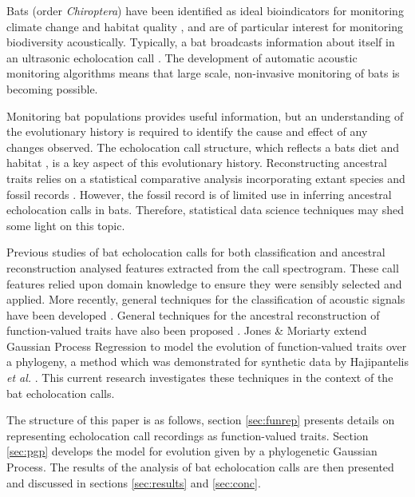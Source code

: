 \documentclass{ws-rv9x6}
\begin{document}
Bats (order \textit{Chiroptera}) have been identified as ideal bioindicators for monitoring climate change and habitat quality \cite{jones2009carpe}, and are of particular interest for monitoring biodiversity acoustically. Typically, a bat broadcasts information about itself in an ultrasonic echolocation call \cite{griffin1944echolocation}. The development of automatic acoustic monitoring algorithms \cite{stathopoulos2017bat} \cite{walters2012continental} means that large scale, non-invasive monitoring of bats is becoming possible.   

Monitoring bat populations provides useful information, but an understanding of the evolutionary history is required to identify the cause and effect of any changes observed. The echolocation call structure, which reflects a bats diet and habitat \cite{aldridge1987morphology}, is a key aspect of this evolutionary history. Reconstructing ancestral traits \cite{joy2016ancestral} relies on a statistical comparative analysis incorporating extant species and fossil records \cite{felsenstein2004inferring}. However, the fossil record is of limited use in inferring ancestral echolocation calls in bats. Therefore, statistical data science techniques may shed some light on this topic.

Previous studies of bat echolocation calls for both classification \cite{walters2012continental} and ancestral reconstruction \cite{collen2012evolution} analysed features extracted from the call spectrogram. These call features relied upon domain knowledge to ensure they were sensibly selected and applied. More recently, general techniques for the classification of acoustic signals have been developed \cite{stathopoulos2014bat} \cite{damoulas2010bayesian}. General techniques for the ancestral reconstruction of function-valued traits have also been proposed \cite{group2012phylogenetic}. Jones \& Moriarty \cite{jones2013evolutionary} extend Gaussian Process Regression \cite{rasmussen2006gaussian} to model the evolution of function-valued traits \cite{meyer2005up} over a phylogeny, a method which was demonstrated for synthetic data by Hajipantelis \textit{et al.} \cite{hadjipantelis2013function}. This current research investigates these techniques in the context of the bat echolocation calls.

The structure of this paper is as follows, section \ref{sec:funrep} presents details on representing echolocation call recordings as function-valued traits. Section \ref{sec:pgp} develops the model for evolution given by a phylogenetic Gaussian Process. The results of the analysis of bat echolocation calls are then presented and discussed in sections \ref{sec:results} and \ref{sec:conc}.
\end{document}
